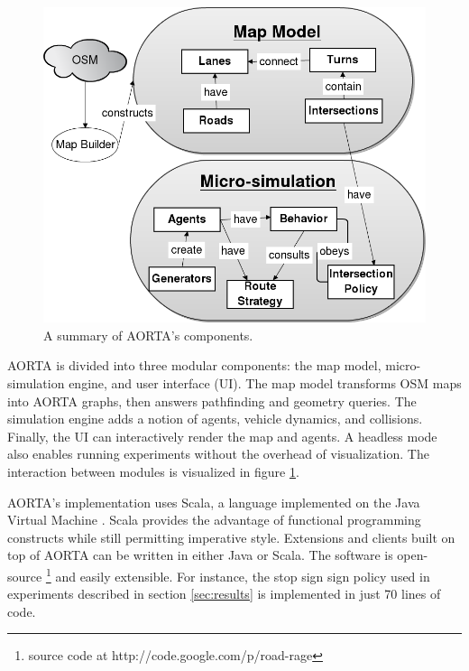 \documentclass[letterpaper, 10 pt, conference]{ieeeconf}  %
\begin{document}
\begin{figure}
  \centering \includegraphics[scale=0.3]{architecture.png}
  \caption{A summary of AORTA's components.}
  \label{fig:arch}
  \vspace{-20pt}
\end{figure}

AORTA is divided into three modular components: the map model, micro-simulation
engine, and user interface (UI). The map model transforms OSM maps into AORTA graphs, then
answers pathfinding and geometry queries. The simulation engine adds a notion of
agents, vehicle dynamics, and collisions. Finally, the UI can
interactively render the map and agents. A headless mode also enables running
experiments without the overhead of visualization. The interaction between
modules is visualized in figure \ref{fig:arch}.

AORTA's implementation uses Scala, a language implemented on the Java Virtual
Machine \cite{scala}. Scala provides the advantage of functional programming
constructs while still permitting imperative style.  Extensions and clients
built on top of AORTA can be written in either Java or Scala. The software is
open-source \footnote{source code at http://code.google.com/p/road-rage} and
easily extensible. For instance, the stop sign sign policy used in experiments
described in section \ref{sec:results} is implemented in just 70 lines of code.

\end{document}
